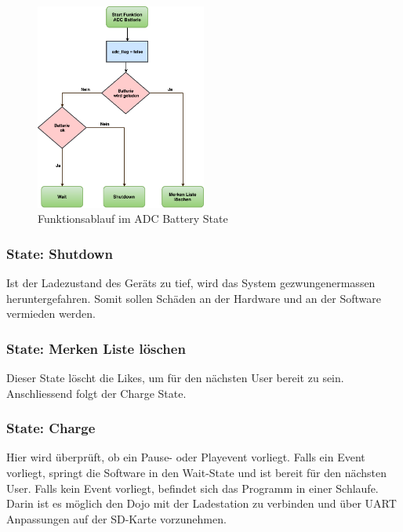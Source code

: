 \begin{figure}[htbp!!!!]
	\centering
	\includegraphics[width=0.5\textwidth]{Data/ADC_Battery_picture.pdf}
	\caption[Statemachine: ADC Battery]{Funktionsablauf im ADC Battery State}
	\label{fig:adcBatteryState}
\end{figure} 

\subsubsection*{State: Shutdown}

Ist der Ladezustand des Geräts zu tief, wird das System gezwungenermassen heruntergefahren. Somit sollen Schäden an der Hardware und an der Software vermieden werden.

\subsubsection*{State: Merken Liste löschen}

Dieser State löscht die Likes, um für den nächsten User bereit zu sein. Anschliessend folgt der Charge State.

\subsubsection*{State: Charge}

Hier wird überprüft, ob ein Pause- oder Playevent vorliegt. Falls ein Event vorliegt, springt die Software in den Wait-State und ist bereit für den nächsten User. Falls kein Event vorliegt, befindet sich das Programm in einer Schlaufe. Darin ist es möglich den Dojo mit der Ladestation zu verbinden und über UART Anpassungen auf der SD-Karte vorzunehmen.

